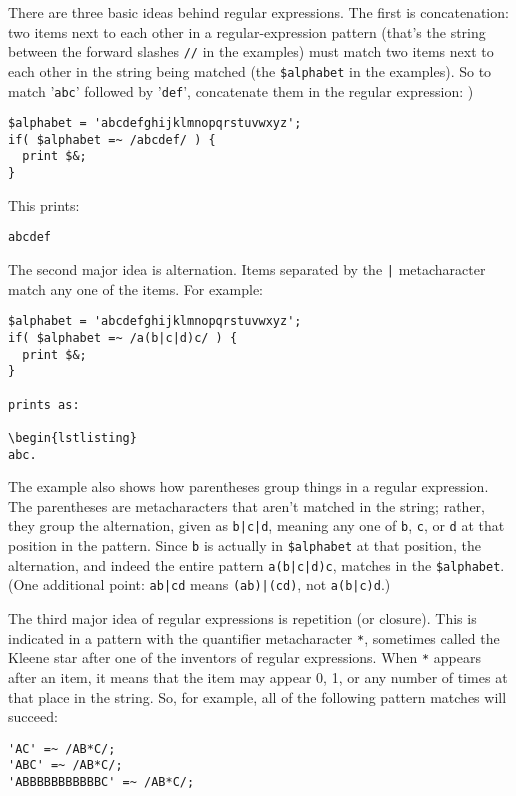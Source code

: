 There are three basic ideas behind regular expressions. The first is concatenation: two items next to each other in a regular-expression pattern (that's the string between the forward slashes \verb|//| in the examples) must match two items next to each other in the string being matched (the \verb|$alphabet| in the examples). So to match '\verb|abc|' followed by '\verb|def|', concatenate them in the regular expression: )

\begin{lstlisting}
$alphabet = 'abcdefghijklmnopqrstuvwxyz';
if( $alphabet =~ /abcdef/ ) {
  print $&; 
}
\end{lstlisting}

This prints:

\begin{lstlisting}
abcdef
\end{lstlisting}

The second major idea is alternation. Items separated by the \verb=|= metacharacter match any one of the items. For example:

\begin{lstlisting}
$alphabet = 'abcdefghijklmnopqrstuvwxyz';
if( $alphabet =~ /a(b|c|d)c/ ) {
  print $&;
}

prints as:

\begin{lstlisting}
abc.
\end{lstlisting}

The example also shows how parentheses group things in a regular expression. The parentheses are metacharacters that aren't matched in the string; rather, they group the alternation, given as \verb=b|c|d=, meaning any one of \verb|b|, \verb|c|, or \verb|d| at that position in the pattern. Since \verb|b| is actually in \verb|$alphabet| at that position, the alternation, and indeed the entire pattern \verb=a(b|c|d)c=, matches in the \verb|$alphabet|. (One additional point: \verb=ab|cd= means \verb=(ab)|(cd)=, not \verb=a(b|c)d=.)

The third major idea of regular expressions is repetition (or closure).  This is indicated in a pattern with the quantifier metacharacter \verb|*|, sometimes called the Kleene star after one of the inventors of regular expressions. When \verb|*| appears after an item, it means that the item may appear 0, 1, or any number of times at that place in the string. So, for example, all of the following pattern matches will succeed:

\begin{lstlisting}
'AC' =~ /AB*C/;
'ABC' =~ /AB*C/;
'ABBBBBBBBBBBC' =~ /AB*C/;
\end{lstlisting}

